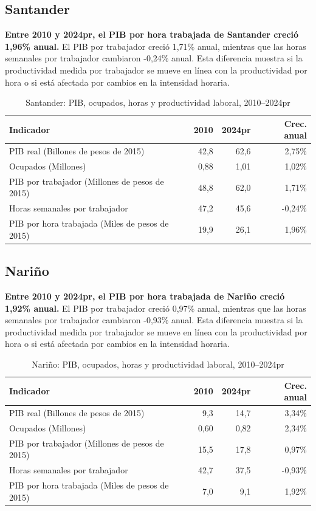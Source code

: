 \subsection{Santander}
\textbf{Entre 2010 y 2024pr, el PIB por hora trabajada de Santander creció 1,96\% anual.} El PIB por trabajador creció 1,71\% anual, mientras que las horas semanales por trabajador cambiaron -0,24\% anual. Esta diferencia muestra si la productividad medida por trabajador se mueve en línea con la productividad por hora o si está afectada por cambios en la intensidad horaria.
\begin{table}[H]
\centering
\caption{Santander: PIB, ocupados, horas y productividad laboral, 2010--2024pr}
\label{tab:departamento_santander_productividad}
\scriptsize
\begin{tabular}{lrrr}
\toprule
Indicador & 2010 & 2024pr & Crec. anual \\
\midrule
PIB real (Billones de pesos de 2015) & 42,8 & 62,6 & 2,75\% \\
Ocupados (Millones) & 0,88 & 1,01 & 1,02\% \\
PIB por trabajador (Millones de pesos de 2015) & 48,8 & 62,0 & 1,71\% \\
Horas semanales por trabajador & 47,2 & 45,6 & -0,24\% \\
PIB por hora trabajada (Miles de pesos de 2015) & 19,9 & 26,1 & 1,96\% \\
\bottomrule
\end{tabular}
\end{table}

\subsection{Nariño}
\textbf{Entre 2010 y 2024pr, el PIB por hora trabajada de Nariño creció 1,92\% anual.} El PIB por trabajador creció 0,97\% anual, mientras que las horas semanales por trabajador cambiaron -0,93\% anual. Esta diferencia muestra si la productividad medida por trabajador se mueve en línea con la productividad por hora o si está afectada por cambios en la intensidad horaria.
\begin{table}[H]
\centering
\caption{Nariño: PIB, ocupados, horas y productividad laboral, 2010--2024pr}
\label{tab:departamento_narino_productividad}
\scriptsize
\begin{tabular}{lrrr}
\toprule
Indicador & 2010 & 2024pr & Crec. anual \\
\midrule
PIB real (Billones de pesos de 2015) & 9,3 & 14,7 & 3,34\% \\
Ocupados (Millones) & 0,60 & 0,82 & 2,34\% \\
PIB por trabajador (Millones de pesos de 2015) & 15,5 & 17,8 & 0,97\% \\
Horas semanales por trabajador & 42,7 & 37,5 & -0,93\% \\
PIB por hora trabajada (Miles de pesos de 2015) & 7,0 & 9,1 & 1,92\% \\
\bottomrule
\end{tabular}
\end{table}

